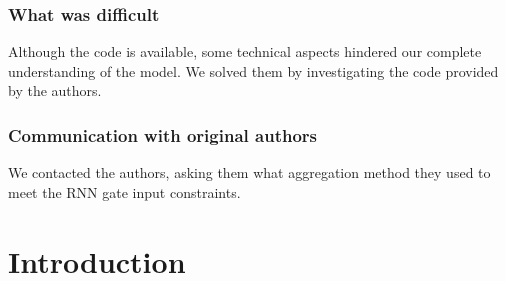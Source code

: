 \subsubsection{What was difficult}
Although the code is available, some technical aspects hindered our complete understanding of the model. We solved them by investigating the code provided by the authors.

\subsubsection{Communication with original authors}
We contacted the authors, asking them what aggregation method they used to meet the RNN gate input constraints.

\newpage

\section{Introduction}

